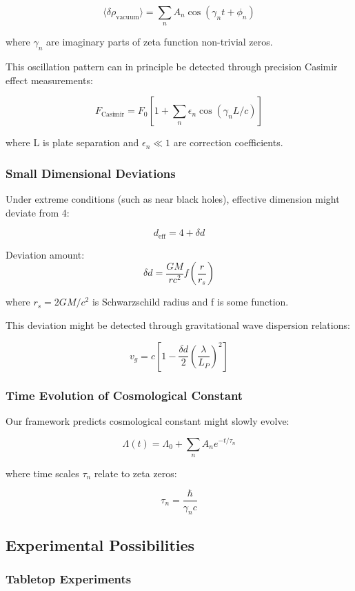 \documentclass[12pt,a4paper]{article}
\begin{document}
$$\langle \delta \rho_{\text{vacuum}} \rangle = \sum_{n} A_n \cos(\gamma_n t + \phi_n)$$

where $\gamma_n$ are imaginary parts of zeta function non-trivial zeros.

This oscillation pattern can in principle be detected through precision Casimir effect measurements:

$$F_{\text{Casimir}} = F_0 \left[ 1 + \sum_n \epsilon_n \cos(\gamma_n L/c) \right]$$

where L is plate separation and $\epsilon_n \ll 1$ are correction coefficients.

\subsubsection{Small Dimensional Deviations}

Under extreme conditions (such as near black holes), effective dimension might deviate from 4:

$$d_{\text{eff}} = 4 + \delta d$$

Deviation amount:
$$\delta d = \frac{GM}{rc^2} f\left(\frac{r}{r_s}\right)$$

where $r_s = 2GM/c^2$ is Schwarzschild radius and f is some function.

This deviation might be detected through gravitational wave dispersion relations:

$$v_g = c \left[ 1 - \frac{\delta d}{2} \left(\frac{\lambda}{L_P}\right)^2 \right]$$

\subsubsection{Time Evolution of Cosmological Constant}

Our framework predicts cosmological constant might slowly evolve:

$$\Lambda(t) = \Lambda_0 + \sum_n A_n e^{-t/\tau_n}$$

where time scales $\tau_n$ relate to zeta zeros:

$$\tau_n = \frac{\hbar}{\gamma_n c}$$

\subsection{Experimental Possibilities}

\subsubsection{Tabletop Experiments}
\end{document}
